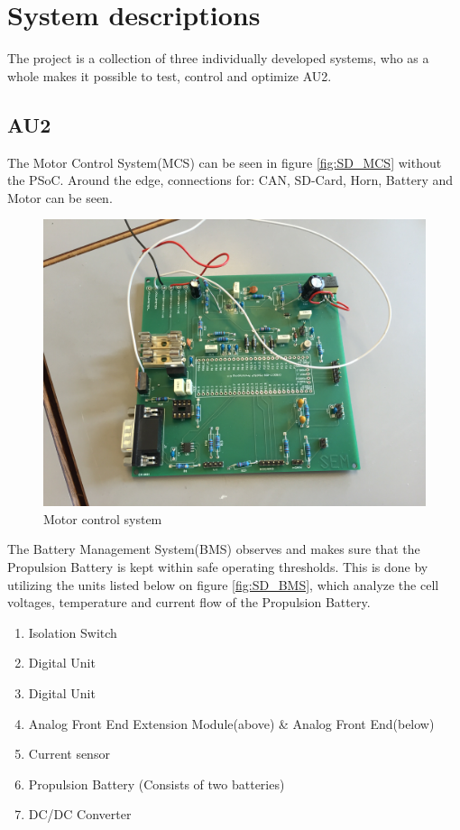 \chapter{System descriptions}
The project is a collection of three individually developed systems, who as a whole makes it possible to test, control and optimize AU2.

\section{AU2}
The Motor Control System(MCS) can be seen in figure \vref{fig:SD_MCS} without the PSoC. Around the edge, connections for: CAN, SD-Card, Horn, Battery and Motor can be seen.

\begin{figure}[H]
	\centering
	\includegraphics[width=0.6\linewidth]{SubPages/Images/SD_MCS}
	\caption{Motor control system}
	\label{fig:SD_MCS}
\end{figure}

The Battery Management System(BMS) observes and makes sure that the Propulsion Battery is kept within safe operating thresholds. This is done by utilizing the units listed below on figure \vref{fig:SD_BMS}, which analyze the cell voltages, temperature and current flow of the Propulsion Battery.

\begin{enumerate}
	\item Isolation Switch
	\item Digital Unit
	\item Digital Unit 
	\item Analog Front End Extension Module(above) \& Analog Front End(below)
	\item Current sensor
	\item Propulsion Battery (Consists of two batteries)
	\item DC/DC Converter
\end{enumerate}

